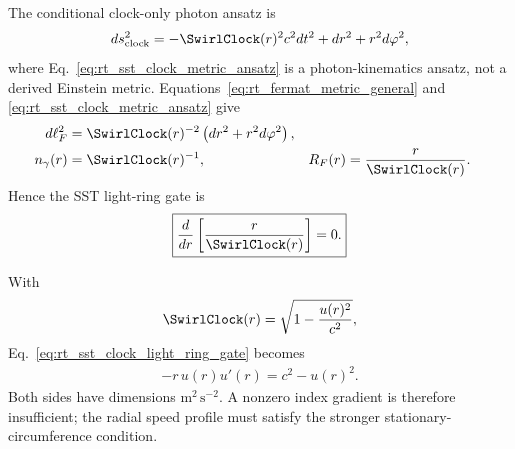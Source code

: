         The conditional clock-only photon ansatz is
        \begin{align}
            ds_{\mathrm{clock}}^2
            =
            -\SwirlClock(r)^2c^2dt^2
            +dr^2+r^2d\varphi^2,
            \label{eq:rt_sst_clock_metric_ansatz}
        \end{align}
        where Eq.~\eqref{eq:rt_sst_clock_metric_ansatz} is a photon-kinematics ansatz,
        not a derived Einstein metric.  Equations~\eqref{eq:rt_fermat_metric_general}
        and \eqref{eq:rt_sst_clock_metric_ansatz} give
        \begin{align}
            d\ell_F^2
            &=
            \SwirlClock(r)^{-2}
            \left(dr^2+r^2d\varphi^2\right),
            \\
            n_\gamma(r)
            &=
            \SwirlClock(r)^{-1},
            &
            R_F(r)
            &=
            \frac{r}{\SwirlClock(r)}.
            \label{eq:rt_sst_fermat_clock_mapping}
        \end{align}
        Hence the SST light-ring gate is
        \begin{align}
            \boxed{
            \frac{d}{dr}
            \left[
                \frac{r}{\SwirlClock(r)}
            \right]
            =0.
            }
            \label{eq:rt_sst_clock_light_ring_gate}
        \end{align}

        With
        \begin{align}
            \SwirlClock(r)
            =
            \sqrt{1-\frac{u(r)^2}{c^2}},
        \end{align}
        Eq.~\eqref{eq:rt_sst_clock_light_ring_gate} becomes
        \begin{align}
            \boxed{
            -r\,u(r)u'(r)
            =
            c^2-u(r)^2.
            }
            \label{eq:rt_sst_light_ring_velocity_gate}
        \end{align}
        Both sides have dimensions \(\mathrm{m^2\,s^{-2}}\).  A nonzero index
        gradient is therefore insufficient; the radial speed profile must satisfy the
        stronger stationary-circumference condition.

